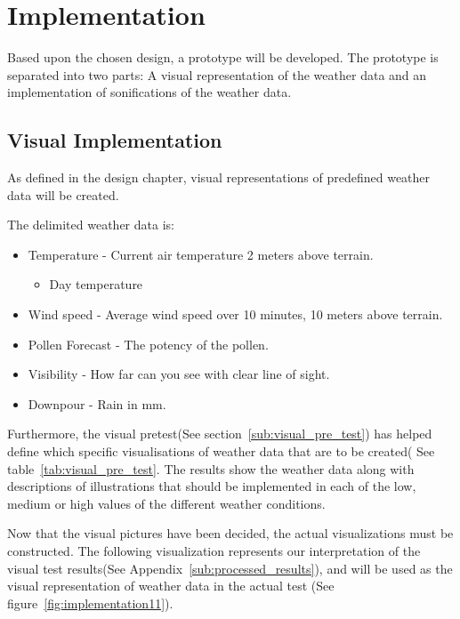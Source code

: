 
\section{Implementation} %
\label{sec:implementation}

Based upon the chosen design, a prototype will be developed. 
The prototype is separated into two parts: A visual representation of the weather data and an implementation of sonifications of the weather data. 



\subsection{Visual Implementation} %
\label{sub:visual_implementation}

As defined in the design chapter, visual representations of predefined weather data will be created.

The delimited weather data is:

\begin{itemize}
    \item Temperature - Current air temperature 2 meters above terrain.
    \begin{itemize}
        \item Day temperature
    \end{itemize}
    \item Wind speed - Average wind speed over 10 minutes, 10 meters above terrain.
    \item Pollen Forecast - The potency of the pollen.
    \item Visibility - How far can you see with clear line of sight.
    \item Downpour - Rain in mm.
\end{itemize}

Furthermore, the visual pretest(See section~\ref{sub:visual_pre_test}) has helped define which specific visualisations of weather data that are to be created( See table~\ref{tab:visual_pre_test}.
The results show the weather data along with descriptions of illustrations that should be implemented in each of the low, medium or high values of the different weather conditions.

Now that the visual pictures have been decided, the actual visualizations must be constructed.
The following visualization represents our interpretation of the visual test results(See Appendix~\ref{sub:processed_results}), and will be used as the visual representation of weather data in the actual test (See figure~\ref{fig:implementation11}).

